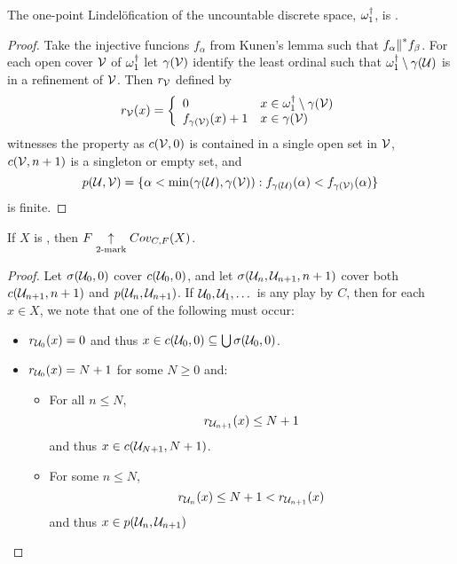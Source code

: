   \begin{theorem}
    The one-point Lindel\"ofication of the uncountable discrete space, $\omega_1^\dagger$, is \scish.
  \end{theorem}

  \begin{proof}
    Take the injective funcions $f_\alpha$ from Kunen's lemma such that $f_\alpha {\parallel}^* f_\beta$. For each open cover $\mathcal{V}$ of $\omega_1^\dagger$ let $\gamma(\mathcal{V})$ identify the least ordinal such that $\omega_1^\dagger\setminus\gamma(\mathcal{U})$ is in a refinement of $\mathcal{V}$. Then $r_{\mathcal{V}}$ defined by
      \[
        r_{\mathcal{V}}(x) = \left\{
      \begin{array}{ll}
        0 & x\in\omega_1^\dagger\setminus\gamma(\mathcal{V}) \\
        f_{\gamma(\mathcal{V})}(x)+1 & x\in\gamma(\mathcal{V})
      \end{array}
      \right.
      \] 
    witnesses the property as $c(\mathcal{V},0)$ is contained in a single open set in $\mathcal{V}$, $c(\mathcal{V},n+1)$ is a singleton or empty set, and
      \[
        p(\mathcal{U},\mathcal{V}) = \{\alpha<\min(\gamma(\mathcal{U}),\gamma(\mathcal{V})) : f_{\gamma(\mathcal{U})}(\alpha)<f_{\gamma(\mathcal{V})}(\alpha)\}
      \]
    is finite.
  \end{proof}

  \begin{theorem}
    If $X$ is \scish, then $F \underset{2\text{-mark}}{\uparrow}Cov_{C,F}(X)$.
  \end{theorem}

  \begin{proof}
    Let $\sigma(\mathcal{U}_0,0)$ cover $c(\mathcal{U}_0,0)$, and let $\sigma(\mathcal{U}_n,\mathcal{U}_{n+1},n+1)$ cover both $c(\mathcal{U}_{n+1},n+1)$ and $p(\mathcal{U}_n,\mathcal{U}_{n+1})$. If $\mathcal{U}_0,\mathcal{U}_1,\dots$ is any play by $C$, then for each $x\in X$, we note that one of the following must occur:
      \begin{itemize}
        \item $r_{\mathcal{U}_0}(x)=0$ and thus $x\in c(\mathcal{U}_0,0)\subseteq \bigcup \sigma(\mathcal{U}_0,0)$.
        \item $r_{\mathcal{U}_0}(x)=N+1$ for some $N\geq 0$ and:
        \begin{itemize}
          \item For all $n\leq N$, 
            \[
              r_{\mathcal{U}_{n+1}}(x)\leq N+1
            \] 
            and thus $x\in c(\mathcal{U}_{N+1},N+1)$.
          \item For some $n \leq N$, 
            \[
              r_{\mathcal{U}_n}(x)\leq N+1 < r_{\mathcal{U}_{n+1}}(x)
            \]
           and thus $x\in p(\mathcal{U}_n,\mathcal{U}_{n+1})$
         \end{itemize}
      \end{itemize}
  \end{proof}

